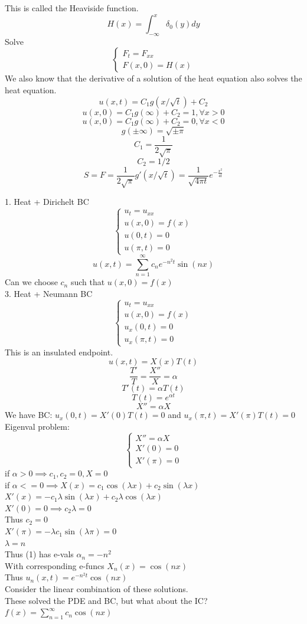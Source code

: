 \documentclass{article}
\begin{document}
This is called the Heaviside function.\\
$$ H(x) = \int_{-\infty}^{x} \delta_0(y) dy$$
Solve 
$$\begin{cases}
    F_t = F_{xx}\\
    F(x,0) = H(x)
\end{cases}$$
We also know that the derivative of a solution of the heat equation also solves the heat equation.
$$ u(x,t) = C_1 g(x/\sqrt{t}) + C_2$$
$$ u(x,0) = C_1 g(\infty) + C_2 = 1, \forall x >0$$
$$ u(x,0) = C_1 g(\infty) + C_2 = 0, \forall x < 0$$
$$ g(\pm \infty) = \sqrt{\pm \pi}$$
$$ C_1 = \frac{1}{2\sqrt{\pi}}$$
$$ C_2 = 1/2$$
$$ S = F = \frac{1}{2\sqrt{\pi}} g'(x/\sqrt{t})= \frac{1}{\sqrt{4\pi t}} e^{-\frac{x^2}{4t}}$$

1. Heat + Dirichelt BC 
$$\begin{cases}
    u_t = u_{xx}\\
    u(x,0) = f(x)\\
    u(0,t) = 0\\
    u(\pi,t) = 0
\end{cases}
$$
$$ u(x,t) = \sum_{n=1}^{\infty} c_n e^{-n^2t} \sin(nx)$$
Can we choose $c_n$ such that $u(x,0) = f(x)$\\
3. Heat + Neumann BC
$$\begin{cases}
    u_t = u_{xx}\\
    u(x,0) = f(x)\\
    u_x(0,t) = 0\\
    u_x(\pi,t) = 0
\end{cases}$$
This is an insulated endpoint.
$$u(x,t) = X(x)T(t)$$
$$\frac{T'}{T} = \frac{X''}{X} = \alpha$$
$$T'(t) = \alpha T(t)$$
$$ T(t) = e^{\alpha t}$$
$$ X'' = \alpha X$$
We have BC: $u_x(0,t) = X'(0)T(t) = 0$ and $u_x(\pi,t) = X'(\pi)T(t) = 0$\\
Eigenval problem:
$$\begin{cases}
    X'' = \alpha X\\
    X'(0) = 0\\
    X'(\pi) = 0
\end{cases}
$$
if $\alpha > 0 \implies c_1,c_2=0, X = 0$\\
if $\alpha <= 0 \implies X(x) = c_1 \cos(\lambda x) + c_2 \sin(\lambda x)$\\
$X'(x) = -c_1 \lambda \sin(\lambda x) + c_2 \lambda \cos(\lambda x)$\\
$X'(0) = 0 \implies c_2 \lambda = 0$\\
Thus $c_2 = 0$\\
$X'(\pi) = -\lambda c_1 \sin(\lambda \pi) = 0$\\
$\lambda = n$\\
Thus (1) has e-vals $\alpha_n = -n^2$\\
With corresponding e-funcs $X_n(x) = \cos(nx)$\\
Thus $u_n(x,t) = e^{-n^2t} \cos(nx)$\\
Consider the linear combination of these solutions.\\
These solved the PDE and BC, but what about the IC?
$f(x) = \sum_{n=1}^{\infty} c_n \cos(nx)$\\
\end{document}
